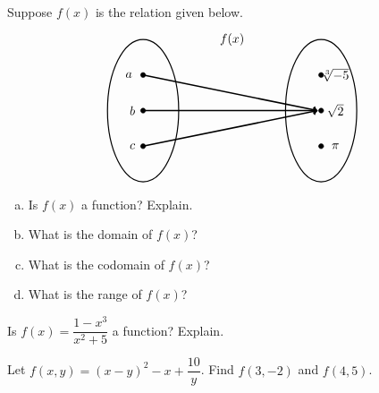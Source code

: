 \documentclass[12pt,letterpaper]{exam}
\begin{document}
\examtitle
{} 
\scores
\newpage

\begin{questions}

\question[10] Suppose $f(x)$ is the relation given below.
	\[
	\begin{tikzpicture}
	\node at (2.5,2) {$f(x)$};
	\draw[line width=0.03cm] (0,0) circle (1 and 2);
	\draw[line width=0.03cm] (5,0) circle (1 and 2);
	
	\draw[fill=black] (0,1) circle (0.07);
	\draw[fill=black] (0,0) circle (0.07);
	\draw[fill=black] (0,-1) circle (0.07);
	
	\draw[fill=black] (5,1) circle (0.07);
	\draw[fill=black] (5,0) circle (0.07);
	\draw[fill=black] (5,-1) circle (0.07);
	
	\draw[line width=0.04cm,->] (0,1) -- (4.9,0);
	\draw[line width=0.04cm,->] (0,0) -- (4.9,0);
	\draw[line width=0.04cm,->] (0,-1) -- (4.9,0);
	
	\node at (-0.4,1) {$a$};
	\node at (-0.3,0) {$b$};
	\node at (-0.3,-1) {$c$};
	
	\node at (5.4,1) {$\sqrt[3]{-5}$};
	\node at (5.4,0) {$\sqrt{2}$};
	\node at (5.4,-1) {$\pi$};
	\end{tikzpicture}
	\]

\begin{enumerate}[(a)]
\item Is $f(x)$ a function? Explain.
\item What is the domain of $f(x)$?
\item What is the codomain of $f(x)$?
\item What is the range of $f(x)$?
\end{enumerate}



\newpage
\question[10] Is $f(x)= \dfrac{1 - x^3}{x^2 + 5}$ a function? Explain. 



\newpage
\question[10] Let $f(x, y)= (x - y)^2 - x + \dfrac{10}{y}$. Find $f(3, -2)$ and $f(4, 5)$. 




\end{questions}
\end{document}
